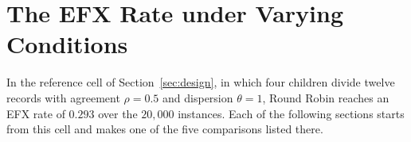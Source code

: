 \chapter{The EFX Rate under Varying Conditions}\label{ch:results}


In the reference cell of Section~\ref{sec:design}, in which four children divide twelve records
with agreement $\rho=0.5$ and dispersion $\theta=1$, Round Robin reaches an EFX rate of $0.293$
over the $20{,}000$ instances. Each of the following sections starts from this cell and makes one
of the five comparisons listed there.






